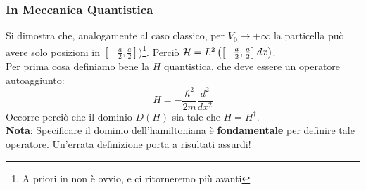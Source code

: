 \documentclass[../../FisicaTeorica.tex]{subfiles}
\begin{document}
\subsubsection{In Meccanica Quantistica}
Si dimostra che, analogamente al caso classico, per $V_0\to +\infty$ la particella può avere solo posizioni in $[-\frac{a}{2},\frac{a}{2}]$)\footnote{A priori in \MQ non è ovvio, e ci ritorneremo più avanti}. Perciò $\mathcal{H}=L^2\left(\left[-\frac{a}{2},\frac{a}{2}\right] dx\right)$.\\
Per prima cosa definiamo bene la $H$ quantistica, che deve essere un operatore autoaggiunto:
\[
H=-\frac{\hbar^2}{2m}\frac{d^2}{dx^2}
\]
Occorre perciò che il dominio $D(H)$ sia tale che $H = H^\dag$.\\
\textbf{Nota}: Specificare il dominio dell'hamiltoniana è \textbf{fondamentale} per definire tale operatore. Un'errata definizione porta a risultati assurdi!\\
\end{document}
